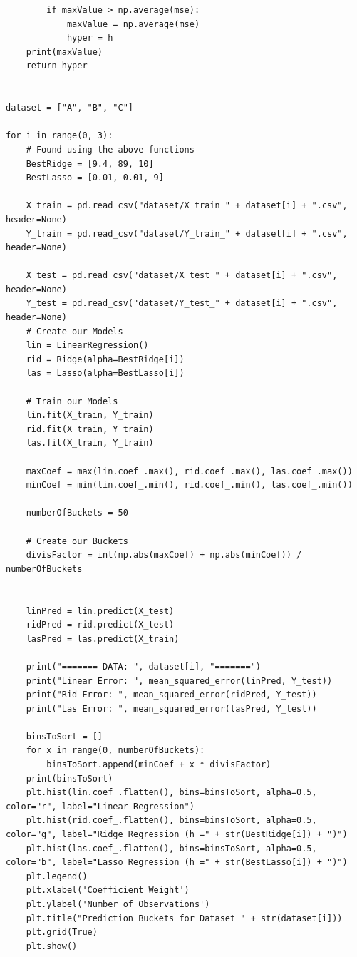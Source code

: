 \documentclass{article}
\begin{document}
\begin{titlepage}
\begin{lstlisting}
        if maxValue > np.average(mse):
            maxValue = np.average(mse)
            hyper = h
    print(maxValue)
    return hyper


dataset = ["A", "B", "C"]

for i in range(0, 3):
    # Found using the above functions
    BestRidge = [9.4, 89, 10]
    BestLasso = [0.01, 0.01, 9]

    X_train = pd.read_csv("dataset/X_train_" + dataset[i] + ".csv", header=None)
    Y_train = pd.read_csv("dataset/Y_train_" + dataset[i] + ".csv", header=None)

    X_test = pd.read_csv("dataset/X_test_" + dataset[i] + ".csv", header=None)
    Y_test = pd.read_csv("dataset/Y_test_" + dataset[i] + ".csv", header=None)
    # Create our Models
    lin = LinearRegression()
    rid = Ridge(alpha=BestRidge[i])
    las = Lasso(alpha=BestLasso[i])

    # Train our Models
    lin.fit(X_train, Y_train)
    rid.fit(X_train, Y_train)
    las.fit(X_train, Y_train)

    maxCoef = max(lin.coef_.max(), rid.coef_.max(), las.coef_.max())
    minCoef = min(lin.coef_.min(), rid.coef_.min(), las.coef_.min())

    numberOfBuckets = 50

    # Create our Buckets
    divisFactor = int(np.abs(maxCoef) + np.abs(minCoef)) / numberOfBuckets


    linPred = lin.predict(X_test)
    ridPred = rid.predict(X_test)
    lasPred = las.predict(X_train)

    print("======= DATA: ", dataset[i], "=======")
    print("Linear Error: ", mean_squared_error(linPred, Y_test))
    print("Rid Error: ", mean_squared_error(ridPred, Y_test))
    print("Las Error: ", mean_squared_error(lasPred, Y_test))

    binsToSort = []
    for x in range(0, numberOfBuckets):
        binsToSort.append(minCoef + x * divisFactor)
    print(binsToSort)
    plt.hist(lin.coef_.flatten(), bins=binsToSort, alpha=0.5, color="r", label="Linear Regression")
    plt.hist(rid.coef_.flatten(), bins=binsToSort, alpha=0.5, color="g", label="Ridge Regression (h =" + str(BestRidge[i]) + ")")
    plt.hist(las.coef_.flatten(), bins=binsToSort, alpha=0.5, color="b", label="Lasso Regression (h =" + str(BestLasso[i]) + ")")
    plt.legend()
    plt.xlabel('Coefficient Weight')
    plt.ylabel('Number of Observations')
    plt.title("Prediction Buckets for Dataset " + str(dataset[i]))
    plt.grid(True)
    plt.show()


\end{lstlisting}
\end{titlepage}
\end{document}
